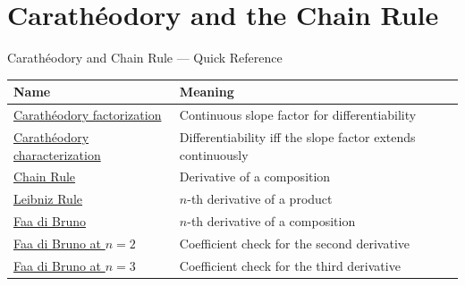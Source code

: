 \section{Carath\'{e}odory and the Chain Rule}

\begin{toolkitbox}{Carath\'{e}odory and Chain Rule --- Quick Reference}
\small
\begin{tabular}{l l}
\toprule
\textbf{Name} & \textbf{Meaning} \\
\midrule
\hyperref[def:caratheodory-factorization]{Carath\'{e}odory factorization} & Continuous slope factor for differentiability \\
\hyperref[thm:caratheodory-characterization-of-differentiability]{Carath\'{e}odory characterization} & Differentiability iff the slope factor extends continuously \\
\hyperref[thm:chain-rule]{Chain Rule} & Derivative of a composition \\
\hyperref[thm:leibniz-rule]{Leibniz Rule} & \(n\)-th derivative of a product \\
\hyperref[thm:faa-di-bruno]{Faa di Bruno} & \(n\)-th derivative of a composition \\
\hyperref[ex:faa-di-bruno-n2]{Faa di Bruno at \(n=2\)} & Coefficient check for the second derivative \\
\hyperref[ex:faa-di-bruno-n3]{Faa di Bruno at \(n=3\)} & Coefficient check for the third derivative \\
\bottomrule
\end{tabular}
\end{toolkitbox}



